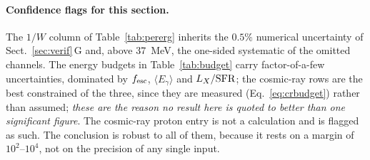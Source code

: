 \documentclass[11pt,a4paper]{article}
\begin{document}
\paragraph{Confidence flags for this section.}
The $1/W$ column of Table~\ref{tab:pererg} inherits the $0.5\%$ numerical
uncertainty of Sect.~\ref{sec:verif}\,G and, above
\SI{37}{\mega\electronvolt}, the one-sided systematic of the omitted channels.
The energy budgets in Table~\ref{tab:budget} carry factor-of-a-few
uncertainties, dominated by $f_{\rm esc}$, $\langle E_\gamma\rangle$ and
$L_X/{\rm SFR}$; the cosmic-ray rows are the best constrained of the three,
since they are measured (Eq.~\ref{eq:crbudget}) rather than assumed; \emph{these are the reason no
result here is quoted to better than one significant figure}. The cosmic-ray
proton entry is not a calculation and is flagged as such. The conclusion is
robust to all of them, because it rests on a margin of $10^{2}$--$10^{4}$, not
on the precision of any single input.

\end{document}
